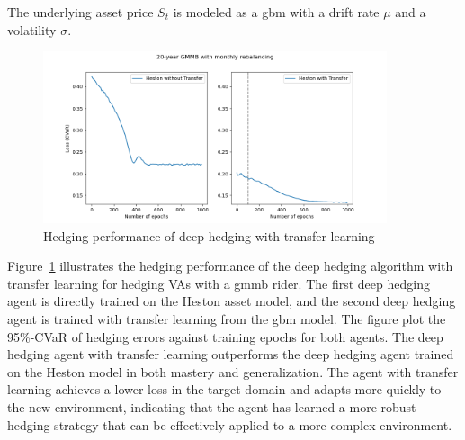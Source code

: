 The underlying asset price $S_t$ is modeled as a \gls{gbm} with a drift rate $\mu$ and a volatility $\sigma$.

\begin{figure}
    \centering
    \includegraphics[width=0.9\textwidth]{./futureWork/figures/CVaR_histories.png}
    \caption{Hedging performance of deep hedging with transfer learning}
    \label{fig3:dh-transfers}
\end{figure}

Figure~\ref{fig3:dh-transfers} illustrates the hedging performance of the deep hedging algorithm with transfer learning for hedging VAs with a \gls{gmmb} rider.
The first deep hedging agent is directly trained on the Heston asset model, and the second deep hedging agent is trained with transfer learning from the \gls{gbm} model.
The figure plot the 95\%-CVaR of hedging errors against training epochs for both agents.
The deep hedging agent with transfer learning outperforms the deep hedging agent trained on the Heston model in both mastery and generalization.
The agent with transfer learning achieves a lower loss in the target domain and adapts more quickly to the new environment, indicating that the agent has learned a more robust hedging strategy that can be effectively applied to a more complex environment.

